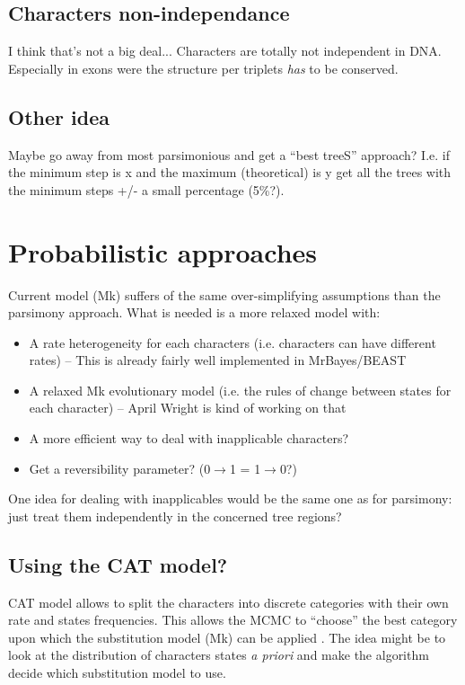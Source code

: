 \documentclass[a4paper,11pt]{article}
\begin{document}
\subsection{Characters non-independance}
I think that's not a big deal... Characters are totally not independent in DNA.
Especially in exons were the structure per triplets \textit{has} to be conserved.

\subsection{Other idea}
Maybe go away from most parsimonious and get a ``best treeS'' approach?
I.e. if the minimum step is x and the maximum (theoretical) is y get all the trees with the minimum steps +/- a small percentage (5\%?).

\section{Probabilistic approaches}
Current model (Mk) suffers of the same over-simplifying assumptions than the parsimony approach.
What is needed is a more relaxed model with:
\begin{itemize}
\item A rate heterogeneity for each characters (i.e. characters can have different rates) -- This is already fairly well implemented in MrBayes/BEAST
\item A relaxed Mk evolutionary model (i.e. the rules of change between states for each character) -- April Wright is kind of working on that
\item A more efficient way to deal with inapplicable characters?
\item Get a reversibility parameter? (0$\rightarrow$1 = 1$\rightarrow$0?)
\end{itemize}
One idea for dealing with inapplicables would be the same one as for parsimony: just treat them independently in the concerned tree regions?

\subsection{Using the CAT model?}
CAT model allows to split the characters into discrete categories with their own rate and states frequencies.
This allows the MCMC to ``choose'' the best category upon which the substitution model (Mk) can be applied \citep{Lartillot01062004}.
The idea might be to look at the distribution of characters states \textit{a priori} and make the algorithm decide which substitution model to use.
\end{document}
